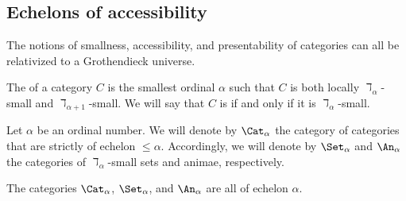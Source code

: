 \subsection{Echelons of accessibility}%
\label{sub:echelons_of_accessibility}

The notions of smallness,
accessibility, and presentability of categories
can all be relativized to a Grothendieck universe.

\begin{definition}
	The  of a category $ C $ is
	the smallest ordinal $ \alpha $ such that
	$ C $ is both
	locally $ \daleth_{\alpha} $-small
	and $ \daleth_{\alpha + 1} $-small.
	We will say that $ C $ is
	if and only if it is $ \daleth_{\alpha} $-small.
\end{definition}

\begin{notation}
	Let $ \alpha $ be an ordinal number.
	We will denote by $ \Cat_{\alpha} $
	the category of categories that are
	strictly of echelon $ \leq \alpha $.
	Accordingly, we will denote by
	$ \Set_{\alpha} $ and $ \An_{\alpha} $
	the categories of $ \daleth_{\alpha} $-small
	sets and animae, respectively.

	The categories $ \Cat_{\alpha} $, $ \Set_{\alpha} $, and $ \An_{\alpha} $
	are all of echelon $ \alpha $.
\end{notation}

